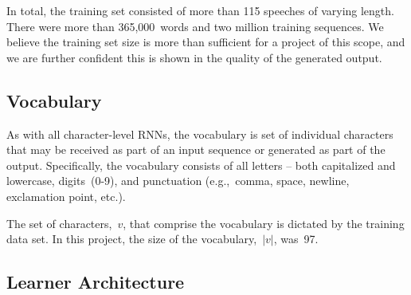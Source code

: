 \documentclass{article}
\begin{document}
In total, the training set consisted of more than 115 speeches of varying length.  There were more than 365,000~words and two million training sequences.  We believe the training set size is more than sufficient for a project of this scope, and we are further confident this is shown in the quality of the generated output.

\subsection{Vocabulary}

As with all character-level RNNs, the vocabulary is set of individual characters that may be received as part of an input sequence or generated as part of the output.  Specifically, the vocabulary consists of all letters -- both capitalized and lowercase, digits~(0-9), and punctuation (e.g.,~comma, space, newline, exclamation point, etc.).

The set of characters,~$v$, that comprise the vocabulary is dictated by the training data set.  In this project, the size of the vocabulary,~$|v|$, was~97.

\subsection{Learner Architecture}
\end{document}
